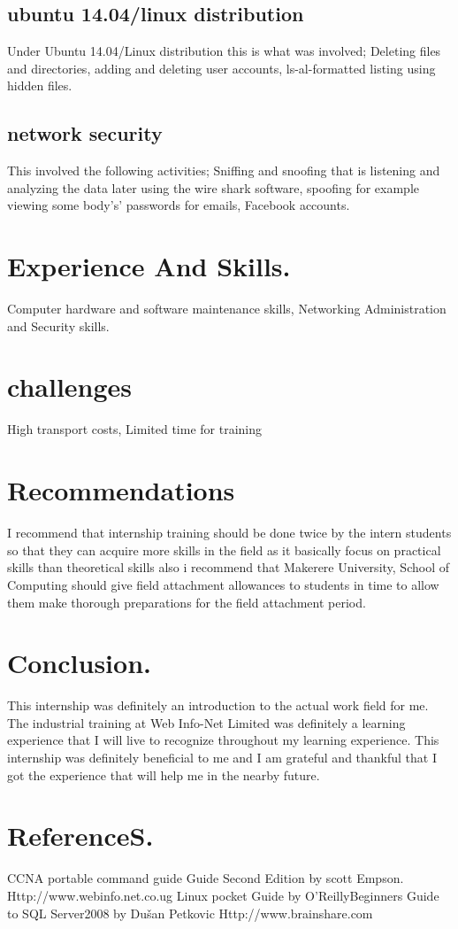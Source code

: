 \documentclass[12]{article}
\begin{document}
\subsection{ubuntu 14.04/linux distribution }
Under Ubuntu 14.04/Linux distribution this is what was involved; Deleting files and directories, adding and deleting user accounts, ls-al-formatted listing using hidden files.
\subsection{network security}
This involved the following activities; Sniffing and snoofing that is listening and analyzing the data later using the wire shark software, spoofing for example viewing some body’s’ passwords for emails, Facebook accounts.
\section{Experience And Skills.}
Computer hardware and software maintenance skills, Networking Administration and Security skills.
\section{challenges}
High transport costs, Limited time for training
\section{Recommendations }
I recommend that internship training should be done twice by the intern students so that they can acquire more skills in the field as it basically focus on practical skills than theoretical skills also i recommend that Makerere University, School of Computing should give field attachment allowances to students in time to allow them make thorough preparations for the field attachment period.
\section{Conclusion.}
This internship was definitely an introduction to the actual work field for me. The industrial training at Web Info-Net Limited was definitely a learning experience that I will live to recognize throughout my learning experience.
This internship was definitely beneficial to me and I am grateful and thankful that I got the experience that will help me in the nearby future.
\section{ReferenceS.}
CCNA portable command guide Guide Second Edition by scott Empson.
Http://www.webinfo.net.co.ug
Linux pocket Guide by O’ReillyBeginners Guide to SQL Server2008 by Dušan Petkovic Http://www.brainshare.com
\end{document}
